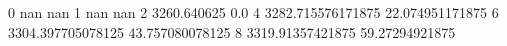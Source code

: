 0 nan nan
1 nan nan
2 3260.640625 0.0
4 3282.715576171875 22.074951171875
6 3304.397705078125 43.757080078125
8 3319.91357421875 59.27294921875
